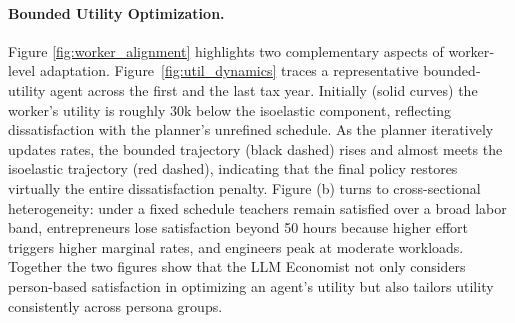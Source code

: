 \paragraph{Bounded Utility Optimization.} Figure \ref{fig:worker_alignment} highlights two complementary aspects of worker‐level adaptation. Figure~\ref{fig:util_dynamics} traces a representative bounded‐utility agent across the first and the last tax year. Initially (solid curves) the worker’s utility is roughly 30k below the isoelastic component, reflecting dissatisfaction with the planner’s unrefined schedule. As the planner iteratively updates rates, the bounded trajectory (black dashed) rises and almost meets the isoelastic trajectory (red dashed), indicating that the final policy restores virtually the entire dissatisfaction penalty. Figure (b) turns to cross-sectional heterogeneity: under a fixed schedule teachers remain satisfied over a broad labor band, entrepreneurs lose satisfaction beyond 50 hours because higher effort triggers higher marginal rates, and engineers peak at moderate workloads. Together the two figures show that the LLM Economist not only considers person-based satisfaction in optimizing an agent's utility but also tailors utility consistently across persona groups.



